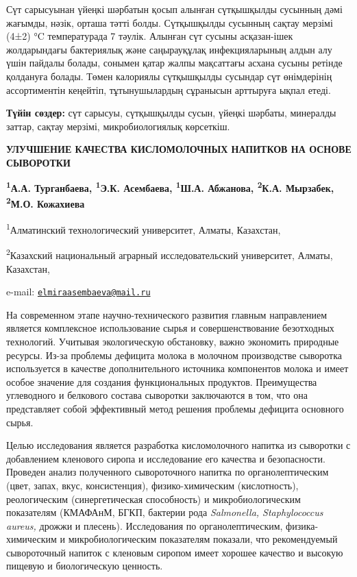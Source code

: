 Сүт сарысуынан үйеңкі шәрбатын қосып алынған сүтқышқылды сусынның дәмі
жағымды, нәзік, орташа тәтті болды. Сүтқышқылды сусынның сақтау мерзімі
(4±2) °C температурада 7 тәулік. Алынған сүт сусыны асқазан-ішек
жолдарындағы бактериялық және саңырауқұлақ инфекцияларының алдын алу
үшін пайдалы болады, сонымен қатар жалпы мақсаттағы асхана сусыны
ретінде қолдануға болады. Төмен калориялы сүтқышқылды сусындар сүт
өнімдерінің ассортиментін кеңейтіп, тұтынушылардың сұранысын арттыруға
ықпал етеді.

{\bfseries Түйін сөздер:} сүт сарысуы, сүтқышқылды сусын, үйеңкі шәрбаты,
минералды заттар, сақтау мерзімі, микробиологиялық көрсеткіш.

\begin{articleheader}
{\bfseries УЛУЧШЕНИЕ КАЧЕСТВА КИСЛОМОЛОЧНЫХ НАПИТКОВ НА ОСНОВЕ СЫВОРОТКИ}

{\bfseries
\textsuperscript{1}А.А. Турганбаева,
\textsuperscript{1}Э.К. Асембаева\textsuperscript{\envelope },
\textsuperscript{1}Ш.А. Абжанова,
\textsuperscript{2}К.А. Мырзабек,
\textsuperscript{2}М.О. Кожахиева}
\end{articleheader}

\begin{affiliation}
\textsuperscript{1}Алматинский технологический университет, Алматы, Казахстан,

\textsuperscript{2}Казахский национальный аграрный исследовательский университет, Алматы, Казахстан,

e-mail: \href{mailto:elmiraasembaeva@mail.ru}{\nolinkurl{elmiraasembaeva@mail.ru}}
\end{affiliation}

На современном этапе научно-технического развития главным направлением
является комплексное использование сырья и совершенствование безотходных
технологий. Учитывая экологическую обстановку, важно экономить природные
ресурсы. Из-за проблемы дефицита молока в молочном производстве
сыворотка используется в качестве дополнительного источника компонентов
молока и имеет особое значение для создания функциональных продуктов.
Преимущества углеводного и белкового состава сыворотки заключаются в
том, что она представляет собой эффективный метод решения проблемы
дефицита основного сырья.

Целью исследования является разработка кисломолочного напитка из
сыворотки с добавлением кленового сиропа и исследование его качества и
безопасности. Проведен анализ полученного сывороточного напитка по
органолептическим (цвет, запах, вкус, консистенция), физико-химическим
(кислотность), реологическим (синергетическая способность) и
микробиологическим показателям (КМАФАнМ, БГКП, бактерии рода
\emph{Salmonella, Staphylococcus aureus,} дрожжи и плесень).
Исследования по органолептическим, физика-химическим и
микробиологическим показателям показали, что рекомендуемый сывороточный
напиток с кленовым сиропом имеет хорошее качество и высокую пищевую и
биологическую ценность.

